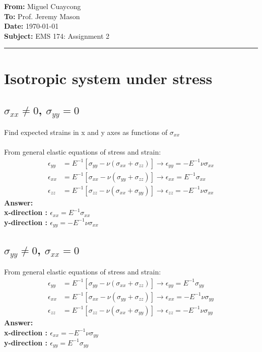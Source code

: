 \documentclass[11pt]{article}
\newcommand{\memoheader}[4]{
  \noindent
  \textbf{From:} #2\\ 
  \textbf{To:} #1\\
  \textbf{Date:} #3\\
  \textbf{Subject:} #4\\[1ex]\hrule\vspace{1.5ex}
}
\begin{document}
\memoheader{Prof. Jeremy Mason}
            {Miguel Cuaycong}
            {\today}
            {EMS 174: Assignment 2}
\section{Isotropic system under stress}
\subsection{$\sigma_{xx} \neq 0$, $\sigma_{yy} = 0$}
Find expected strains in x and y axes as functions of $\sigma_{xx}$
\\~\\
From general elastic equations of stress and strain:
\begin{align}
    \epsilon_{yy} &= E^{-1}[\sigma_{yy} - \nu(\sigma_{xx} + \sigma_{zz})] \rightarrow \epsilon_{yy} = -E^{-1}\nu\sigma_{xx} \label{eq1}
    \\
    \epsilon_{xx} &= E^{-1}[\sigma_{xx} - \nu(\sigma_{yy} + \sigma_{zz})] \rightarrow \epsilon_{xx} = E^{-1}\sigma_{xx}\label{eq2}
    \\
    \epsilon_{zz} &= E^{-1}[\sigma_{zz} - \nu(\sigma_{xx} + \sigma_{yy})] \rightarrow  \epsilon_{zz} = -E^{-1}\nu\sigma_{xx} \label{eq3}
\end{align}
\textbf{Answer: 
\\
x-direction : $\epsilon_{xx} = E^{-1}\sigma_{xx}$
\\
y-direction : $\epsilon_{yy} = -E^{-1}\nu\sigma_{xx}$
}
\subsection{$\sigma_{yy} \neq 0$, $\sigma_{xx} = 0$}
From general elastic equations of stress and strain:
\begin{align}
    \epsilon_{yy} &= E^{-1}[\sigma_{yy} - \nu(\sigma_{xx} + \sigma_{zz})] \rightarrow \epsilon_{yy} = E^{-1}\sigma_{yy} \label{eq1}
    \\
    \epsilon_{xx} &= E^{-1}[\sigma_{xx} - \nu(\sigma_{yy} + \sigma_{zz})] \rightarrow \epsilon_{xx} = -E^{-1}\nu\sigma_{yy}\label{eq2}
    \\
    \epsilon_{zz} &= E^{-1}[\sigma_{zz} - \nu(\sigma_{xx} + \sigma_{yy})] \rightarrow  \epsilon_{zz} = -E^{-1}\nu\sigma_{yy} \label{eq3}
\end{align}
\textbf{Answer: 
\\
x-direction : $\epsilon_{xx} = -E^{-1}\nu\sigma_{yy}$
\\
y-direction : $\epsilon_{yy} = E^{-1}\sigma_{yy}$
}
\end{document}
